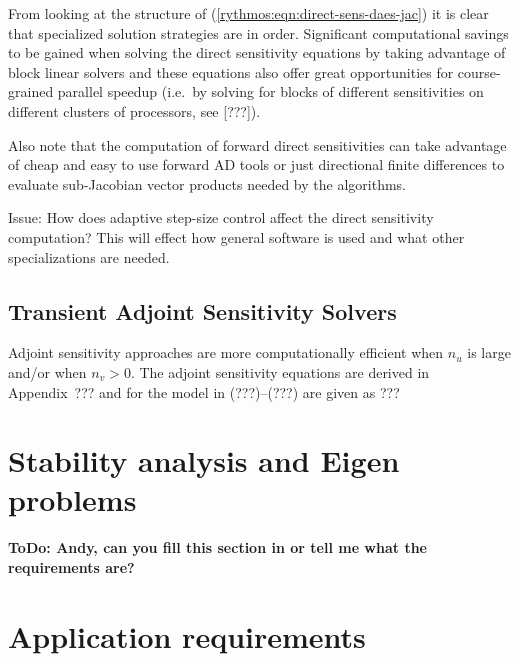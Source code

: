 \documentclass[pdf,ps2pdf,11pt]{SANDreport}
\begin{document}
From looking at the structure of (\ref{rythmos:eqn:direct-sens-daes-jac}) it
is clear that specialized solution strategies are in order.  Significant
computational savings to be gained when solving the direct sensitivity
equations by taking advantage of block linear solvers and these equations also
offer great opportunities for course-grained parallel speedup (i.e.\ by
solving for blocks of different sensitivities on different clusters of
processors, see [???]).

Also note that the computation of forward direct sensitivities can take
advantage of cheap and easy to use forward AD tools or just directional finite
differences to evaluate sub-Jacobian vector products needed by the algorithms.

Issue: How does adaptive step-size control affect the direct sensitivity
computation?  This will effect how general software is used and what other
specializations are needed.

\subsection{Transient Adjoint Sensitivity Solvers}
\label{rythmos:scn:transientsensitivity:adjoint}

Adjoint sensitivity approaches are more computationally efficient when $n_u$
is large and/or when $n_v > 0$.  The adjoint sensitivity equations are derived in
Appendix~??? and for the model in (???)--(???) are given as
%
???
%

\section{Stability analysis and Eigen problems}

{}\textbf{ToDo: Andy, can you fill this section in or tell me what the
requirements are?}

\section{Application requirements}
\end{document}
